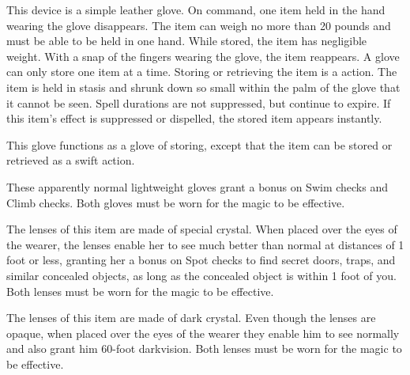  This device is a simple leather glove. On command, one item held in the hand wearing the glove disappears. The item can weigh no more than 20 pounds and must be able to be held in one hand. While stored, the item has negligible weight. With a snap of the fingers wearing the glove, the item reappears. A glove can only store one item at a time. Storing or retrieving the item is a  action. The item is held in stasis and shrunk down so small within the palm of the glove that it cannot be seen. Spell durations are not suppressed, but continue to expire. If this item's effect is suppressed or dispelled, the stored item appears instantly.

 This glove functions as a glove of storing, except that the item can be stored or retrieved as a swift action.

 These apparently normal lightweight gloves grant a   bonus on Swim checks and Climb checks. Both gloves must be worn for the magic to be effective.

 The lenses of this item are made of special crystal. When placed over the eyes of the wearer, the lenses enable her to see much better than normal at distances of 1 foot or less, granting her a   bonus on Spot checks to find secret doors, traps, and similar concealed objects, as long as the concealed object is within 1 foot of you. Both lenses must be worn for the magic to be effective.

 The lenses of this item are made of dark crystal. Even though the lenses are opaque, when placed over the eyes of the wearer they enable him to see normally and also grant him 60-foot darkvision. Both lenses must be worn for the magic to be effective.


